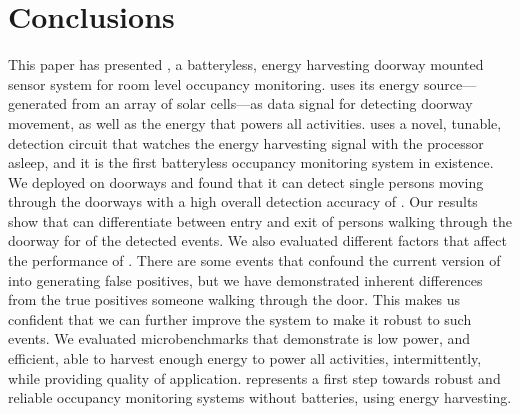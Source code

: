 \section{Conclusions}
\label{sec:conclusions}

This paper has presented \sysname, a batteryless, energy harvesting doorway mounted sensor system for room level occupancy monitoring.
\sysname uses its energy source---generated from an array of solar cells---as data signal for detecting doorway movement, as well as the energy that powers all activities.
\sysname uses a novel, tunable, detection circuit that watches the energy harvesting signal with the processor asleep, and it is the first batteryless occupancy monitoring system in existence.
We deployed \sysname on \numDoors doorways and found that it can detect single persons moving through the doorways with a high overall detection accuracy of \SysAccuracy. Our results show that \sysname can differentiate between entry and exit of persons walking through the doorway for \dirAccuracy of the detected events.
We also evaluated different factors that affect the performance of \sysname.
There are some events that confound the current version of \sysname into generating false positives, but we have demonstrated inherent differences from the true positives \ie someone walking through the door.
This makes us confident that we can further improve the \sysname system to make it robust to such events.
We evaluated \sysname microbenchmarks that demonstrate \sysname is low power, and efficient, able to harvest enough energy to power all activities, intermittently, while providing quality of application.
\sysname represents a first step towards robust and reliable occupancy monitoring systems without batteries, using energy harvesting.
